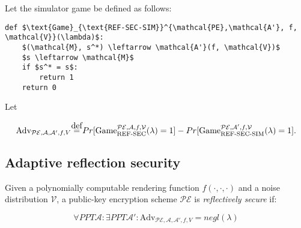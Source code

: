 \documentclass{article}
\newcommand\defeq{\stackrel{\mathclap{\normalfont\mbox{def}}}{=}}
\begin{document}
Let the simulator game be defined as follows:

\begin{lstlisting}[texcl,mathescape]
def $\text{Game}_{\text{REF-SEC-SIM}}^{\mathcal{PE},\mathcal{A'}, f,
\mathcal{V}}(\lambda)$:
    $(\mathcal{M}, s^*) \leftarrow \mathcal{A'}(f, \mathcal{V})$
    $s \leftarrow \mathcal{M}$
    if $s^* = s$:
        return 1
    return 0
\end{lstlisting}

Let

\begin{equation*}
    \text{Adv}_{\mathcal{PE}, \mathcal{A}, \mathcal{A}', f, V}
    \defeq
    Pr[\text{Game}_{\text{REF-SEC}}^{\mathcal{PE},\mathcal{A}, f,
\mathcal{V}}(\lambda) = 1]
    -
    Pr[\text{Game}_{\text{REF-SEC-SIM}}^{\mathcal{PE},\mathcal{A'}, f,
\mathcal{V}}(\lambda) = 1].
\end{equation*}

\subsection*{Adaptive reflection security}

Given a polynomially computable rendering function $f(\cdot, \cdot, \cdot)$ and
a  noise distribution $\mathcal{V}$, a public-key encryption scheme
$\mathcal{PE}$ is \textit{reflectively secure} if:

\begin{equation*}
\forall PPT \mathcal{A}: \exists PPT \mathcal{A}': \text{Adv}_{\mathcal{PE}, \mathcal{A}, \mathcal{A}', f, V} = negl(\lambda)
\end{equation*}
\end{document}
